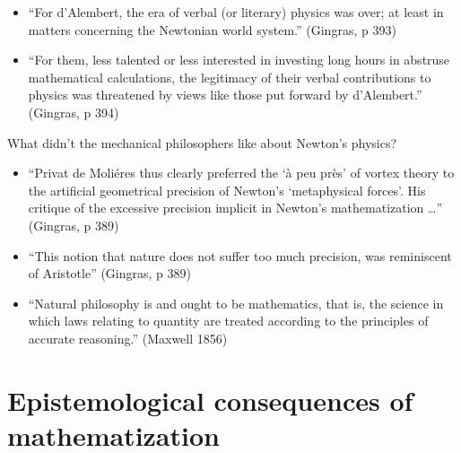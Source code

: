 \documentclass[fleqn]{beamer}
\begin{document}
\begin{frame}

  \begin{itemize}
  \item ``For d'Alembert, the era of verbal (or literary) physics was
    over; at least in matters concerning the Newtonian world system.''
    (Gingras, p 393)
  \item ``For them, less talented or less interested in investing long
    hours in abstruse mathematical calculations, the legitimacy of
    their verbal contributions to physics was threatened by views like
    those put forward by d'Alembert.'' (Gingras, p 394)
  \end{itemize}

\end{frame}

\begin{frame}{What didn't the mechanical philosophers like about Newton's physics?}

  \begin{itemize}
  \item ``Privat de Moli{\'e}res thus clearly preferred the `\`a peu
    pr\`es' of vortex theory to the artificial geometrical precision
    of Newton's `metaphysical forces'. His critique of the excessive
    precision implicit in Newton's mathematization \dots '' (Gingras,
    p 389)
  \item ``This notion that nature does not suffer too much precision,
    was reminiscent of Aristotle'' (Gingras, p 389)
  \end{itemize}

\end{frame}

\begin{frame}

  \begin{itemize}
  \item ``Natural philosophy is and ought to be mathematics, that is,
    the science in which laws relating to quantity are treated
    according to the principles of accurate reasoning.'' (Maxwell 1856)
  \end{itemize}

\end{frame}

\section{Epistemological consequences of mathematization}
\end{document}
